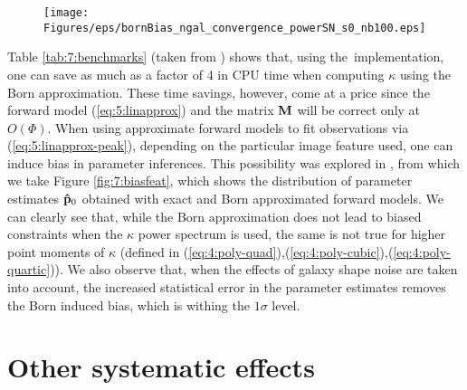 %
\begin{figure}
\begin{center}
\texttt{[image: Figures/eps/bornBias\_ngal\_convergence\_powerSN\_s0\_nb100.eps]}
\end{center}
\caption{}
\label{fig:7:biasbornngal}
\end{figure}
%
Table \ref{tab:7:benchmarks} (taken from \citep{PetriBorn}) shows that, using the \LT\,implementation, one can save as much as a factor of 4 in CPU time when computing $\kappa$ using the Born approximation. These time savings, however, come at a price since the forward model (\ref{eq:5:linapprox}) and the matrix $\mathbf{M}$ will be correct only at $O(\Phi)$. When using approximate forward models to fit observations via (\ref{eq:5:linapprox-peak}), depending on the particular image feature used, one can induce bias in parameter inferences. This possibility was explored in \citep{PetriBorn}, from which we take Figure \ref{fig:7:biasfeat}, which shows the distribution of parameter estimates $\mathbf{\hat{p}}_0$ obtained with exact and Born approximated forward models. We can clearly see that, while the Born approximation does not lead to biased constraints when the $\kappa$ power spectrum is used, the same is not true for higher point moments of $\kappa$ (defined in (\ref{eq:4:poly-quad}),(\ref{eq:4:poly-cubic}),(\ref{eq:4:poly-quartic})). We also observe that, when the effects of galaxy shape noise are taken into account, the increased statistical error in the parameter estimates removes the Born induced bias, which is withing the $1\sigma$ level.

\section{Other systematic effects}

